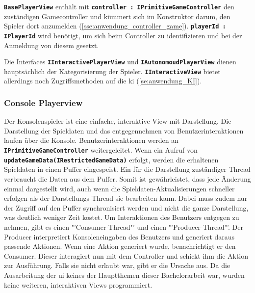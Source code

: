 \documentclass[
							a4paper, 
							11pt, 
							openany, 
							liststotoc,
							parskip=half, 
   							headings=normal
						]{scrreprt}
\begin{document}
{\textbf{\texttt{BasePlayerView}} enthält mit \textbf{\texttt{controller : IPrimitiveGameController}} den zu\-stän\-di\-gen Gamecontroller und kümmert sich im Konstruktor darum, den Spieler dort anzumelden (\autoref{sse:anwendung_controller_game}). \textbf{\texttt{playerId : IPlayerId}} wird benötigt, um sich beim Controller zu identifizieren und bei der Anmeldung von diesem gesetzt.

Die Interfaces \textbf{\texttt{IInteractivePlayerView}} und \textbf{\texttt{IAutonomoudPlayerView}} dienen\\ haupt\-säch\-lich der Kategorisierung der Spieler. \textbf{\texttt{IInteractiveView}} bietet allerdings noch Zugriffsmethoden auf die \acs{ki} (\autoref{se:anwendung_KI}).

\subsubsection{Console Playerview} \label{ssse:anwendung_views_console_player}
Der Konsolenspieler ist eine einfache, interaktive View mit Darstellung. Die Darstellung der Spieldaten und das entgegennehmen von Benutzerinteraktionen laufen über die Konsole. Benutzerinteraktionen werden an \textbf{\texttt{IPrimitiveGameController}} weitergeleitet.
Wenn ein Aufruf von \textbf{\texttt{updateGameData(IRestrictedGameData)}} erfolgt, werden die erhaltenen Spieldaten in einen Puffer eingespeist. Ein für die Darstellung zuständiger Thread verbraucht die Daten aus dem Puffer. Somit ist gewährleistet, dass jede Änderung einmal dargestellt wird, auch wenn die Spieldaten-Aktualisierungen schneller erfolgen als der Darstellungs-Thread sie bearbeiten kann. Dabei muss zudem nur der Zugriff auf den Puffer synchronisiert werden und nicht die ganze Darstellung, was deutlich weniger Zeit kostet.\newline
Um Interaktionen des Benutzers entgegen zu nehmen, gibt es einen "'Consumer-Thread"' und einen "'Producer-Thread"'. Der Producer interpretiert Konsoleneingaben des Benutzers und generiert daraus passende Aktionen. Wenn eine Aktion generiert wurde, benachrichtigt er den Consumer.\newline
Dieser interagiert nun mit dem Controller und schickt ihm die Aktion zur Ausführung. Falls sie nicht erlaubt war, gibt er die Ursache aus.\newline
Da die Ausarbeitung der \acs{ui} keines der Hauptthemen dieser Bachelorarbeit war, wurden keine weiteren, interaktiven Views programmiert.
}
\end{document}

